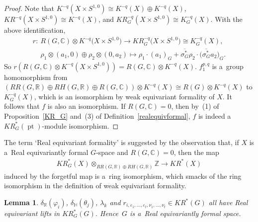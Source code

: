 \documentclass[11pt]{article}
\numberwithin{equation}{section}
\newtheorem{Lemma}[Theorem]{Lemma}
\DeclareMathOperator{\pt}{pt}
\begin{document}
\begin{proof}
Note that $K^{-q}(X\times S^{1, 0})\cong K^{-q}(X)\oplus K^{-q}(X)$, $KR^{-q}(X\times S^{1, 0})\cong K^{-q}(X)$, and
$KR_G^{-q}(X\times S^{1, 0})\cong K_G^{-q}(X)$.
With the above identif\/ication,
\begin{gather*}
r: \ R(G, \mathbb{C})\otimes K^{-q}\big(X\times S^{1, 0}\big)  \to  KR_G^{-q}\big(X\times S^{1, 0}\big)\cong K_G^{-q}(X),
\\
\phantom{r: {}} \
\rho_1\otimes(a_1, 0)\oplus \rho_2\otimes (0, a_2)  \mapsto  \rho_1\cdot (a_1)_G+\overline{\sigma_G^*}
\rho_2\cdot \big(\overline{\sigma_G^*}a_2\big)_G.
\end{gather*}
So $r(R(G, \mathbb{C})\otimes K^{-q}(X\times S^{1, 0}))= R(G, \mathbb{C})\otimes K^{-q}(X)$.
$f_1^{p, q}$ is a~group homomorphism from $(RR(G, \mathbb{R})\oplus RH(G, \mathbb{R})\oplus R(G, \mathbb{C}))\otimes
K^{-q}(X)\cong R(G)\otimes K^{-q}(X)$ to $K_G^{-q}(X)$, which is an isomorphism by weak equivariant formality of $X$.
It follows that $f$ is also an isomorphism.
If $R(G, \mathbb{C})=0$, then by~(1) of Proposition~\ref{KR_G} and~(3) of Def\/inition~\ref{realequivformal}, $f$ is
indeed a~$KR_G^*(\pt)$-module isomorphism.
\end{proof}
\begin{Remark}
The term `Real equivariant formality' is suggested by the observation that, if $X$ is a~Real equivariantly formal
$G$-space and $R(G, \mathbb{C})=0$, then the map
\begin{gather*}
KR^*_G(X)\otimes_{RR(G, \mathbb{R})\oplus RH(G, \mathbb{R})}\mathbb{Z}\to KR^*(X)
\end{gather*}
induced by the forgetful map is a~ring isomorphism, which smacks of the ring isomorphism in the def\/inition of weak
equivariant formality.
\end{Remark}
\begin{Lemma}
\label{realequivlift}
$\delta_\mathbb{R}(\varphi_i)$, $\delta_\mathbb{H}(\theta_j)$, $\lambda_k$ and $r_{i, \varepsilon_1, \dots,
\varepsilon_t, \nu_1, \dots, \nu_t}\in KR^*(G)$ all have Real equivariant lifts in $KR_G^*(G)$.
Hence~$G$ is a~Real equivariantly formal space.
\end{Lemma}
\end{document}
